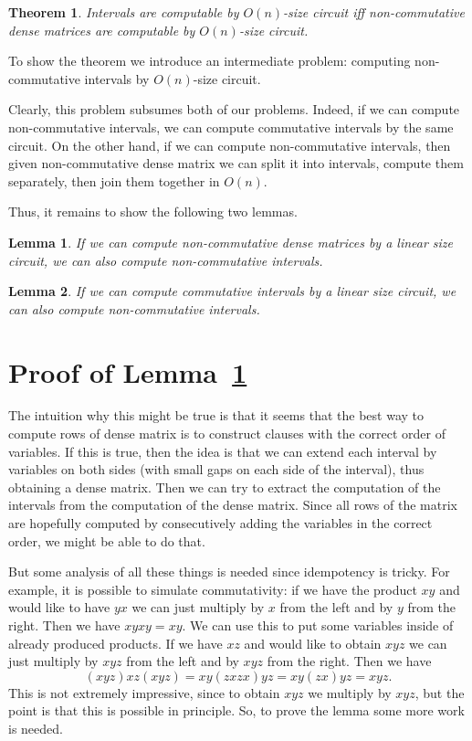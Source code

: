 \documentclass[11pt,letterpaper]{article}
\newtheorem{lemma}{Lemma}
\newtheorem{theorem}{Theorem}
\begin{document}
\begin{theorem}
Intervals are computable by $O(n)$-size circuit iff non-commutative dense matrices are computable by $O(n)$-size circuit.
\end{theorem}

To show the theorem we introduce an intermediate problem: computing non-commutative intervals by $O(n)$-size circuit.

Clearly, this problem subsumes both of our problems. Indeed, if we can compute non-commutative intervals, we can compute commutative intervals by the same circuit.
On the other hand, if we can compute non-commutative intervals, then given non-commutative dense matrix we can split it into intervals, compute them separately, then join them together in $O(n)$.

Thus, it remains to show the following two lemmas.

\begin{lemma} \label{lem:dense_matrices}
If we can compute non-commutative dense matrices by a linear size circuit, we can also compute non-commutative intervals.
\end{lemma}

\begin{lemma} \label{lem:intervals}
If we can compute commutative intervals by a linear size circuit, we can also compute non-commutative intervals.
\end{lemma}

\section{Proof of Lemma~\ref{lem:dense_matrices}}

The intuition why this might be true is that it seems that the best way to compute rows of dense matrix is to construct clauses with the correct order of variables. If this is true, then the idea is that we can extend each interval by variables on both sides (with small gaps on each side of the interval), thus obtaining a dense matrix. Then we can try to extract the computation of the intervals from the computation of the dense matrix. Since all rows of the matrix are hopefully computed by consecutively adding the variables in the correct order, we might be able to do that.

But some analysis of all these things is needed since idempotency is tricky. For example, it is possible to simulate commutativity: if we have the product $xy$ and would like to have $yx$ we can just multiply by $x$ from the left and by $y$ from the right. Then we have $xyxy=xy$. We can use this to put some variables inside of already produced products. If we have $xz$ and would like to obtain $xyz$ we can just multiply by $xyz$ from the left and by $xyz$ from the right. Then we have
$$
(xyz)xz(xyz)=xy(zxzx)yz=xy(zx)yz=xyz.
$$
This is not extremely impressive, since to obtain $xyz$ we multiply by $xyz$, but the point is that this is possible in principle. So, to prove the lemma some more work is needed.
\end{document}
